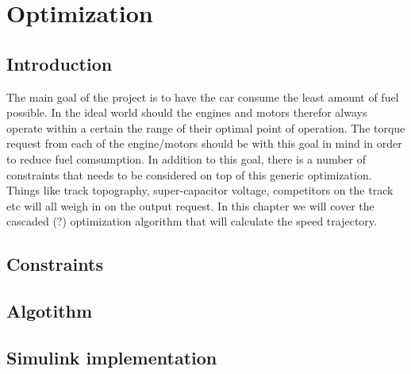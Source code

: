\chapter{Optimization}
\section{Introduction}
The main goal of the project is to have the car consume the least amount of fuel
possible. In the ideal world should the engines and motors therefor always
operate within a certain the range of their optimal point of operation. The
torque request from each of the engine/motors should be with this goal in mind
in order to reduce fuel comsumption. In addition to this goal, there is a number
of constraints that needs to be considered on top of this generic optimization.
Things like track topography, super-capacitor voltage, competitors on the track
etc will all weigh in on the output request. In this chapter we will cover the
cascaded (?) optimization algorithm that will calculate the speed trajectory.

\section{Constraints}

\section{Algotithm}

\section{Simulink implementation}
